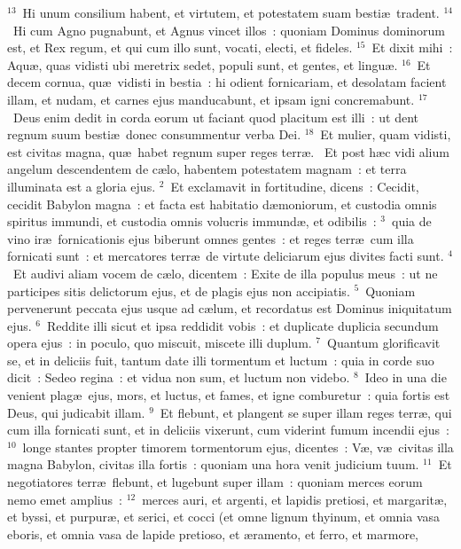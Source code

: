 ${}^{13}$~Hi unum consilium habent, et virtutem, et potestatem suam besti\ae\ tradent.
${}^{14}$~Hi cum Agno pugnabunt, et Agnus vincet illos~: quoniam Dominus dominorum est, et Rex regum, et qui cum illo sunt, vocati, electi, et fideles.
${}^{15}$~Et dixit mihi~: Aqu\ae , quas vidisti ubi meretrix sedet, populi sunt, et gentes, et lingu\ae .
${}^{16}$~Et decem cornua, qu\ae\ vidisti in bestia~: hi odient fornicariam, et desolatam facient illam, et nudam, et carnes ejus manducabunt, et ipsam igni concremabunt.
${}^{17}$~Deus enim dedit in corda eorum ut faciant quod placitum est illi~: ut dent regnum suum besti\ae\ donec consummentur verba Dei.
${}^{18}$~Et mulier, quam vidisti, est civitas magna, qu\ae\ habet regnum super reges terr\ae .
~\lettrine[lines=10,image=true,loversize=0.05,lraise=-0.03]{E}{}t post h\ae c vidi alium angelum descendentem de c\ae lo, habentem potestatem magnam~: et terra illuminata est a gloria ejus.
${}^{2}$~Et exclamavit in fortitudine, dicens~: Cecidit, cecidit Babylon magna~: et facta est habitatio d\ae moniorum, et custodia omnis spiritus immundi, et custodia omnis volucris immund\ae , et odibilis~:
${}^{3}$~quia de vino ir\ae\ fornicationis ejus biberunt omnes gentes~: et reges terr\ae\ cum illa fornicati sunt~: et mercatores terr\ae\ de virtute deliciarum ejus divites facti sunt.
${}^{4}$~Et audivi aliam vocem de c\ae lo, dicentem~: Exite de illa populus meus~: ut ne participes sitis delictorum ejus, et de plagis ejus non accipiatis.
${}^{5}$~Quoniam pervenerunt peccata ejus usque ad c\ae lum, et recordatus est Dominus iniquitatum ejus.
${}^{6}$~Reddite illi sicut et ipsa reddidit vobis~: et duplicate duplicia secundum opera ejus~: in poculo, quo miscuit, miscete illi duplum.
${}^{7}$~Quantum glorificavit se, et in deliciis fuit, tantum date illi tormentum et luctum~: quia in corde suo dicit~: Sedeo regina~: et vidua non sum, et luctum non videbo.
${}^{8}$~Ideo in una die venient plag\ae\ ejus, mors, et luctus, et fames, et igne comburetur~: quia fortis est Deus, qui judicabit illam.
${}^{9}$~Et flebunt, et plangent se super illam reges terr\ae , qui cum illa fornicati sunt, et in deliciis vixerunt, cum viderint fumum incendii ejus~:
${}^{10}$~longe stantes propter timorem tormentorum ejus, dicentes~: V\ae , v\ae\ civitas illa magna Babylon, civitas illa fortis~: quoniam una hora venit judicium tuum.
${}^{11}$~Et negotiatores terr\ae\ flebunt, et lugebunt super illam~: quoniam merces eorum nemo emet amplius~:
${}^{12}$~merces auri, et argenti, et lapidis pretiosi, et margarit\ae , et byssi, et purpur\ae , et serici, et cocci (et omne lignum thyinum, et omnia vasa eboris, et omnia vasa de lapide pretioso, et \ae ramento, et ferro, et marmore,
